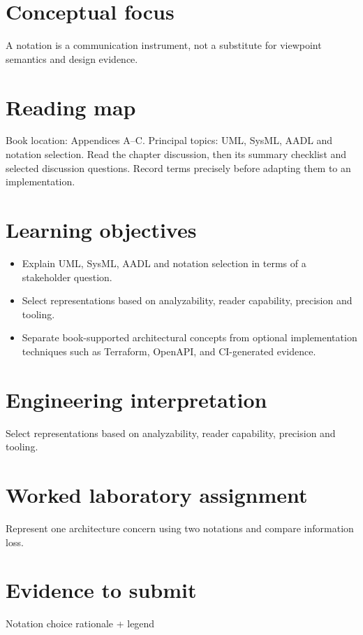 \documentclass[10pt,letterpaper]{article}
\begin{document}
\DocProvenance
\section{Conceptual focus}
A notation is a communication instrument, not a substitute for viewpoint semantics and design evidence.

\section{Reading map}
Book location: Appendices A--C. Principal topics: UML, SysML, AADL and notation selection. Read the chapter discussion, then its summary checklist and selected discussion questions. Record terms precisely before adapting them to an implementation.

\section{Learning objectives}
\begin{itemize}
\item Explain UML, SysML, AADL and notation selection in terms of a stakeholder question.
\item Select representations based on analyzability, reader capability, precision and tooling.
\item Separate book-supported architectural concepts from optional implementation techniques such as Terraform, OpenAPI, and CI-generated evidence.
\end{itemize}
\section{Engineering interpretation}
Select representations based on analyzability, reader capability, precision and tooling.

\section{Worked laboratory assignment}
Represent one architecture concern using two notations and compare information loss.

\section{Evidence to submit}
Notation choice rationale + legend
\end{document}

